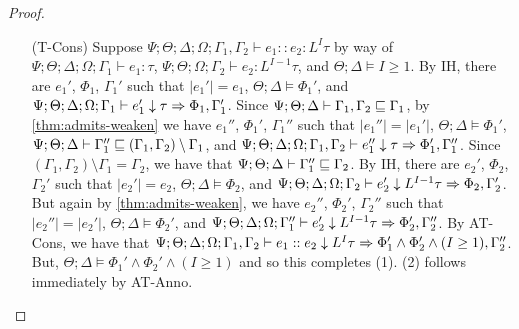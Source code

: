 \begin{proof}
\begin{itemize}
  \item[(T-Cons)] Suppose
  $\Psi ; \Theta ; \Delta ; \Omega ; \Gamma_1, \Gamma_2\vdash e_1 :: e_2 : L^I \tau$ by way of
  $\Psi ; \Theta ; \Delta ; \Omega ; \Gamma_1\vdash e_1 : \tau$,
  $\Psi ; \Theta ; \Omega ; \Gamma_2\vdash e_2 : L^{I-1} \tau$, and
  $\Theta ; \Delta \vDash I \geq 1$.
  By IH, there are $e_1'$, $\Phi_1$, $\Gamma_1'$ such that
  $|e_1'| = e_1$,
  $\Theta ; \Delta \vDash \Phi_1'$, and
  $\Psi ; \Theta ; \Delta ; \Omega ; \Gamma_1 \vdash e_1' \downarrow \tau \Rightarrow \Phi_1,\Gamma_1'$.
  Since $\Psi ; \Theta ; \Delta \vdash \Gamma_1,\Gamma_2 \sqsubseteq \Gamma_1$,
  by \autoref{thm:admits-weaken} we have $e_1''$, $\Phi_1'$, $\Gamma_1''$ such that
  $|e_1''| = |e_1'|$,
  $\Theta ; \Delta \vDash \Phi_1'$,
  $\Psi ; \Theta ; \Delta \vdash \Gamma_1'' \sqsubseteq (\Gamma_1,\Gamma_2) \setminus \Gamma_1$, and
  $\Psi ; \Theta ; \Delta ; \Omega ; \Gamma_1,\Gamma_2 \vdash e_1'' \downarrow \tau \Rightarrow \Phi_1',\Gamma_1''$.
  Since $(\Gamma_1,\Gamma_2) \setminus \Gamma_1 = \Gamma_2$,
  we have that
  $\Psi ; \Theta ; \Delta \vdash \Gamma_1'' \sqsubseteq \Gamma_2$.
  By IH, there are $e_2'$, $\Phi_2$, $\Gamma_2'$ such that
  $|e_2'| = e_2$,
  $\Theta ; \Delta \vDash \Phi_2$, and
  $\Psi ; \Theta ; \Delta ; \Omega ; \Gamma_2 \vdash e_2' \downarrow L^{I-1} \tau \Rightarrow \Phi_2,\Gamma_2'$.
  But again by \autoref{thm:admits-weaken}, we have $e_2''$, $\Phi_2'$, $\Gamma_2''$ such that
  $|e_2''| = |e_2'|$,
  $\Theta ; \Delta \vDash \Phi_2'$, and
  $\Psi ; \Theta ; \Delta ; \Omega ; \Gamma_1'' \vdash e_2' \downarrow L^{I-1} \tau \Rightarrow \Phi_2',\Gamma_2''$.
  By AT-Cons, we have that
  $\Psi ; \Theta ; \Delta ; \Omega ; \Gamma_1,\Gamma_2 \vdash e_1 :: e_2 \downarrow L^I \tau \Rightarrow \Phi_1' \wedge \Phi_2' \wedge (I \geq 1), \Gamma_2''$.
  But, $\Theta ; \Delta \vDash \Phi_1' \wedge \Phi_2' \wedge (I \geq 1)$ and so this completes (1). (2) follows immediately by AT-Anno.
  

\end{itemize}
\end{proof}
